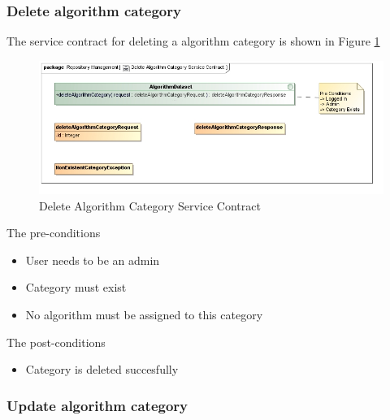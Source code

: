 \subsubsection {Delete algorithm category}

The service contract for deleting a algorithm category is shown in Figure \ref{fig:deleteAlgorithmCatService}
\begin{figure}[H]
  \begin{center}
  \includegraphics[scale=0.6]{../Diagrams and Charts/Test Data/Delete Algorithm Category Service Contract.jpg}
  \caption{Delete Algorithm Category Service Contract}
  \label{fig:deleteAlgorithmCatService}
  \end{center}
  
\end{figure}

The pre-conditions
\begin{itemize}
  \item User needs to be an admin
  \item Category must exist
  \item No algorithm must be assigned to this category
\end{itemize}

The post-conditions
\begin{itemize}
  \item Category is deleted succesfully
\end{itemize}

\subsubsection {Update algorithm category}

